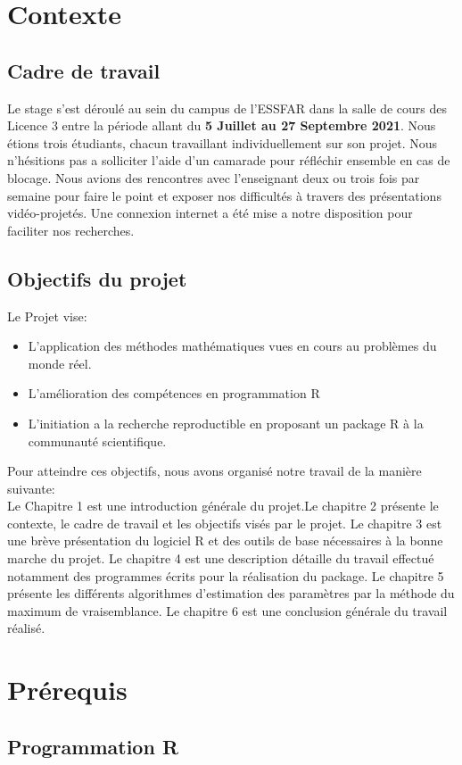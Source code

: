 \documentclass[12pt,a4paper]{scrbook}
\begin{document}
	\chapter{Contexte}
		\section{Cadre de travail}
		Le stage s'est déroulé au sein du campus de l'ESSFAR dans la salle de cours des Licence 3 entre la période allant du \textbf{5 Juillet au 27 Septembre 2021}. Nous étions trois étudiants, chacun travaillant individuellement sur son projet. Nous n'hésitions pas a solliciter l'aide d'un camarade pour réfléchir ensemble en cas de blocage. Nous avions des rencontres avec l'enseignant deux ou trois fois par semaine pour faire le point et exposer nos difficultés à travers des présentations vidéo-projetés. Une connexion internet a été mise a notre disposition pour faciliter nos recherches. 
		\section{Objectifs du projet}
		Le Projet vise:
		\begin{itemize}
			\item L'application des méthodes mathématiques vues en cours au problèmes du monde réel.
			\item L'amélioration des compétences en programmation R
			\item L'initiation a la recherche reproductible en proposant un package R à la communauté scientifique.
		\end{itemize}
	Pour atteindre ces objectifs, nous avons organisé notre travail de la manière suivante:\\
	Le Chapitre 1 est une introduction générale du projet.Le chapitre 2 présente le contexte, le cadre de travail et les objectifs visés par le projet. Le chapitre 3 est une brève présentation du logiciel R et des outils de base nécessaires à la bonne marche du projet. Le chapitre 4 est une description détaille du travail effectué notamment des programmes écrits pour la réalisation du package. Le chapitre 5 présente les différents algorithmes d'estimation des paramètres par la méthode du maximum de vraisemblance. Le chapitre 6 est une conclusion générale du travail réalisé. 
	\chapter{Prérequis}
		\section{Programmation R}
\end{document}
